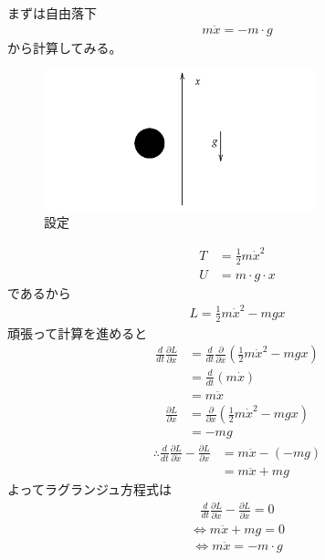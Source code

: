 \documentclass[a4paper,11pt]{jsarticle}
\begin{document}
まずは自由落下
\begin{align*}
  m\ddot{x} = -m\cdot g
\end{align*}
から計算してみる。
\begin{figure}[b]
  \centering
  \includegraphics[width = 0.7\textwidth]{20210514_Freefall.png}
  \caption{設定}
  \label{}
\end{figure}
\begin{align*}
  T &= \frac{1}{2}m\dot{x}^2
  \\ U & = m\cdot g\cdot x
\end{align*}
であるから
\begin{align*}
  L = \frac{1}{2}m\dot{x}^2 - mgx
\end{align*}
頑張って計算を進めると
\begin{align*}
  \frac{d}{dt}\frac{\partial L}{\partial \dot{x}} 
  &= \frac{d}{dt}\frac{\partial }{\partial \dot{x}}\left(\frac{1}{2}m\dot{x}^2 - mgx\right)
  \\ &= \frac{d}{dt}\left(m\dot{x}\right)
  \\ &= m\ddot{x}
\end{align*}
\begin{align*}
  \frac{\partial L}{\partial x}
  &= \frac{\partial }{\partial x}\left(\frac{1}{2}m\dot{x}^2 - mgx\right)
  \\ &= - mg
\end{align*}
\begin{align*}
  \therefore \frac{d}{dt}\frac{\partial L}{\partial \dot{x}} - \frac{\partial L}{\partial x}
  &= m\ddot{x} - \left(-mg\right)
  \\ &= m\ddot{x} + mg
\end{align*}
よってラグランジュ方程式は
\begin{align*}
  \frac{d}{dt}\frac{\partial L}{\partial \dot{x}} - \frac{\partial L}{\partial x} = 0
\end{align*}
\begin{align*}
  \Leftrightarrow m\ddot{x} + mg = 0
\end{align*}
\begin{align*}
  \Leftrightarrow m\ddot{x} = -m\cdot g
\end{align*}
\end{document}
